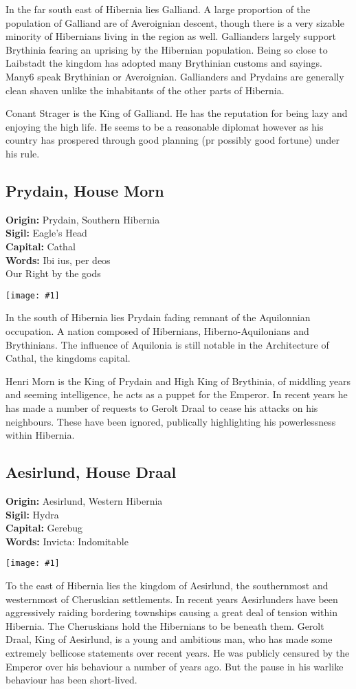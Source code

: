 \documentclass[a4paper]{dnd5}
\newcommand\inc[1]{
 \begin{center}\texttt{[image: \#1]}\end{center}
}
\newcommand\origin{\textbf{Origin: }}
\newcommand\sigil{\textbf{Sigil: }}
\newcommand\words{\textbf{Words: }}
\newcommand\wordsii{\hspace*{4em}}
\newcommand\capital{\textbf{Capital: }}
\begin{document}
In the far south east of Hibernia lies Galliand.  A large proportion of the population of Galliand are of Averoignian descent, though there is a very sizable minority of Hibernians living in the region as well.  Gallianders largely support Brythinia fearing an uprising by the Hibernian population.  Being so close to Laibstadt the kingdom has adopted many Brythinian customs and sayings.  Many6 speak Brythinian or Averoignian.  Gallianders and Prydains are generally clean shaven unlike the inhabitants of the other parts of Hibernia.

Conant Strager is the King of Galliand.  He has the reputation for being lazy and enjoying the high life.  He seems to be a reasonable diplomat however as his country has prospered through good planning (pr possibly good fortune) under his rule.


\subsection{Prydain, House Morn}
\origin Prydain, Southern Hibernia\\
\sigil Eagle's Head\\
\capital Cathal\\
\words Ibi ius, per deos\\
\wordsii Our Right by the gods\\
\inc{morn.png}

In the south of Hibernia lies Prydain fading remnant of the Aquilonnian occupation.  A nation composed of Hibernians, Hiberno-Aquilonians and Brythinians.  
The influence of Aquilonia is still notable in the Architecture of Cathal, the kingdoms capital.  

Henri Morn is the King of Prydain and High King of Brythinia, of middling years and seeming intelligence, he acts as a puppet for the Emperor.  In recent years he has made a number of requests to Gerolt Draal to cease his attacks on his neighbours.  These have been ignored, publically highlighting his powerlessness within Hibernia.


\subsection{Aesirlund, House Draal}
\origin Aesirlund, Western Hibernia\\
\sigil Hydra\\
\capital Gerebug\\
\words Invicta: Indomitable\\
\inc{draal.png}

To the east of Hibernia lies the kingdom of Aesirlund, the southernmost and westernmost of Cheruskian settlements.  In recent years Aesirlunders have been aggressively raiding bordering townships causing a great deal of tension within Hibernia.  The Cheruskians hold the Hibernians to be beneath them.  Gerolt Draal, King of Aesirlund, is a young and ambitious man, who has made some extremely bellicose statements over recent years.   He was publicly censured by the Emperor over his behaviour a number of years ago.  But the pause in his warlike behaviour has been short-lived.  
\end{document}

